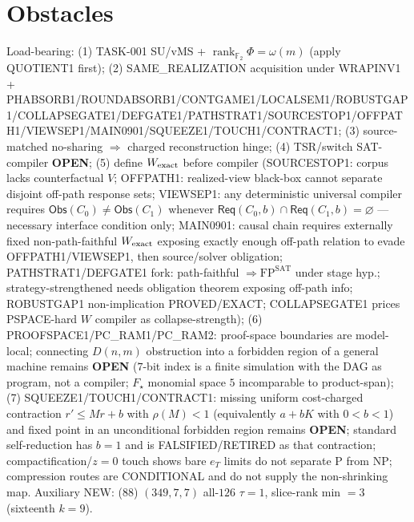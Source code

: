 \documentclass[11pt]{article}
\begin{document}
\section*{Obstacles}
Load-bearing: (1) TASK-001 SU/vMS + $\operatorname{rank}_{\mathbb F_2}\Phi=\omega(m)$ (apply QUOTIENT1 first);
(2) SAME\_REALIZATION acquisition under WRAPINV1 + PHABSORB1/ROUNDABSORB1/CONTGAME1/LOCALSEM1/ROBUSTGAP1/COLLAPSEGATE1/DEFGATE1/PATHSTRAT1/SOURCESTOP1/OFFPATH1/VIEWSEP1/MAIN0901/SQUEEZE1/TOUCH1/CONTRACT1;
(3) source-matched no-sharing $\Rightarrow$ charged reconstruction hinge;
(4) TSR/switch SAT-compiler \textbf{OPEN};
(5) define $W_{\rm exact}$ before compiler (SOURCESTOP1: corpus lacks counterfactual $V$;
OFFPATH1: realized-view black-box cannot separate disjoint off-path response sets;
VIEWSEP1: any deterministic universal compiler requires $\mathsf{Obs}(C_0)\ne\mathsf{Obs}(C_1)$
whenever $\mathsf{Req}(C_0,b)\cap\mathsf{Req}(C_1,b)=\varnothing$ --- necessary interface condition only;
MAIN0901: causal chain requires externally fixed non-path-faithful $W_{\rm exact}$ exposing
exactly enough off-path relation to evade OFFPATH1/VIEWSEP1, then source/solver obligation;
PATHSTRAT1/DEFGATE1 fork: path-faithful $\Rightarrow\mathrm{FP}^{\mathrm{SAT}}$ under stage hyp.;
strategy-strengthened needs obligation theorem exposing off-path info;
ROBUSTGAP1 non-implication PROVED/EXACT; COLLAPSEGATE1 prices PSPACE-hard $W$ compiler as collapse-strength);
(6) PROOFSPACE1/PC\_RAM1/PC\_RAM2: proof-space boundaries are model-local; connecting $D(n,m)$ obstruction into a
forbidden region of a general machine remains \textbf{OPEN} ($7$-bit index is a finite simulation with the DAG as program, not a compiler; $F_\star$ monomial space $5$ incomparable to product-span);
(7) SQUEEZE1/TOUCH1/CONTRACT1: missing uniform cost-charged contraction $r'\le Mr+b$ with $\rho(M){\lt}1$ (equivalently $a+bK$ with $0{<}b{<}1$) and fixed point in an unconditional forbidden region remains \textbf{OPEN};
standard self-reduction has $b{=}1$ and is FALSIFIED/RETIRED as that contraction; compactification/$z{=}0$ touch shows bare $e_T$ limits do not separate P from NP;
compression routes are CONDITIONAL and do not supply the non-shrinking map.
Auxiliary NEW: (88) $(349,7,7)$ all-$126$ $\tau{=}1$, slice-rank min $=3$ (sixteenth $k{=}9$).
\end{document}
